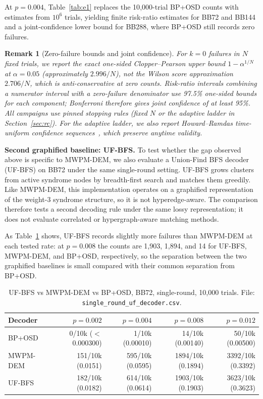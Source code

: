 \documentclass[pdflatex,sn-mathphys-num]{sn-jnl}
\theoremstyle{thmstyleone}
\theoremstyle{thmstyletwo}
\newtheorem{remark}{Remark}
\theoremstyle{thmstylethree}
\begin{document}
At $p=0.004$, Table~\ref{tab:e1} replaces the 10{,}000-trial BP+OSD counts with estimates from $10^{6}$ trials, yielding finite risk-ratio estimates for BB72 and BB144 and a joint-confidence lower bound for BB288, where BP+OSD still records zero failures.

\begin{remark}[Zero-failure bounds and joint confidence]\label{rem:zerofail}
For $k=0$ failures in $N$ fixed trials, we report the exact one-sided Clopper--Pearson upper bound $1-\alpha^{1/N}$ at $\alpha=0.05$ (approximately $2.996/N$), not the Wilson score approximation $2.706/N$, which is anti-conservative at zero counts. Risk-ratio intervals combining a numerator interval with a zero-failure denominator use 97.5\% one-sided bounds for each component; Bonferroni therefore gives joint confidence of at least 95\%. All campaigns use pinned stopping rules (fixed $N$ or the adaptive ladder in Section~\ref{sec:rc}). For the adaptive ladder, we also report Howard--Ramdas time-uniform confidence sequences~\cite{howard2021confidence}, which preserve anytime validity.
\end{remark}

\noindent\textbf{Second graphified baseline: UF-BFS.} To test whether the gap observed above is specific to MWPM-DEM, we also evaluate a Union-Find BFS decoder (UF-BFS) on BB72 under the same single-round setting. UF-BFS grows clusters from active syndrome nodes by breadth-first search and matches them greedily. Like MWPM-DEM, this implementation operates on a graphified representation of the weight-3 syndrome structure, so it is not hyperedge-aware. The comparison therefore tests a second decoding rule under the same lossy representation; it does not evaluate correlated or hypergraph-aware matching methods.

As Table~\ref{tab:uf} shows, UF-BFS records slightly more failures than MWPM-DEM at each tested rate: at $p=0.008$ the counts are 1{,}903, 1{,}894, and 14 for UF-BFS, MWPM-DEM, and BP+OSD, respectively, so the separation between the two graphified baselines is small compared with their common separation from BP+OSD.

\begin{table}[htbp]\centering\small
\caption{UF-BFS vs MWPM-DEM vs BP+OSD, BB72, single-round, 10{,}000 trials. File: \texttt{single\_round\_uf\_decoder.csv}.}
\label{tab:uf}
{\setlength{\tabcolsep}{3pt}
\begin{tabular}{@{}lrrrr@{}}
\toprule
Decoder & $p=0.002$ & $p=0.004$ & $p=0.008$ & $p=0.012$ \\
\midrule
BP+OSD   & 0/10k ($<$0.000300) & 1/10k (0.00010) & 14/10k (0.00140) & 50/10k (0.00500) \\
MWPM-DEM & 151/10k (0.0151) & 595/10k (0.0595) & 1894/10k (0.1894) & 3392/10k (0.3392) \\
UF-BFS   & 182/10k (0.0182) & 614/10k (0.0614) & 1903/10k (0.1903) & 3623/10k (0.3623) \\
\bottomrule
\end{tabular}}
\end{table}
\end{document}
